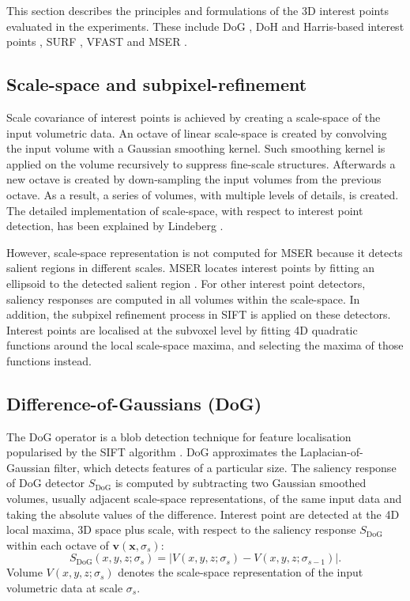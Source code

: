 This section describes the principles and formulations of the 3D interest points evaluated in the experiments. These include DoG \cite{Flitton2010, Pham2011}, DoH and Harris-based interest points \cite{Laptev2005}, SURF \cite{Willems2008, Knopp2010}, VFAST \cite{Yu2010} and MSER \cite{Donoser2006, Riemenschneider2009}. 

\subsection{Scale-space and subpixel-refinement}
\label{sec/eval/subvoxel}

Scale covariance of interest points is achieved by creating a scale-space of the input volumetric data. An octave of linear scale-space is created by convolving the input volume with a Gaussian smoothing kernel. Such smoothing kernel is applied on the volume recursively to suppress fine-scale structures. Afterwards a new octave is created by down-sampling the input volumes from the previous octave. As a result, a series of volumes, with multiple levels of details, is created. The detailed implementation of scale-space, with respect to interest point detection, has been explained by Lindeberg \cite{Lindeberg1998}. 

However, scale-space representation is not computed for MSER because it detects salient regions in different scales. MSER locates interest points by fitting an ellipsoid to the detected salient region \cite{Matas2004}. For other interest point detectors, saliency responses are computed in all volumes within the scale-space. In addition, the subpixel refinement process in SIFT \cite{Lowe2004} is applied on these detectors. Interest points are localised at the subvoxel level by fitting 4D quadratic functions around the local scale-space maxima, and selecting the maxima of those functions instead. 

\subsection{Difference-of-Gaussians (DoG)}
The DoG operator is a blob detection technique for feature localisation popularised by the SIFT algorithm \cite{Lowe2004}. DoG approximates the Laplacian-of-Gaussian filter, which detects features of a particular size. 
The saliency response of DoG detector $S_{\textrm{DoG}}$ is computed by subtracting two Gaussian smoothed volumes, usually adjacent scale-space representations, of the same input data and taking the absolute values of the difference.
Interest point are detected at the 4D local maxima, \ie 3D space plus scale, with respect to the saliency response $S_{\textrm{DoG}}$ within each octave of $\mathbf{v}(\mathbf{x},\sigma_s)$: 
\begin{equation}
	\label{eqn/eval/dog} 
	S_{\textrm{DoG}}(x,y,z;\sigma_s) = \bigg|V(x,y,z;\sigma_s) - V(x,y,z;\sigma_{s-1})\bigg|.
\end{equation}
Volume $V(x,y,z;\sigma_s)$ denotes the scale-space representation of the input volumetric data at scale $\sigma_s$.

